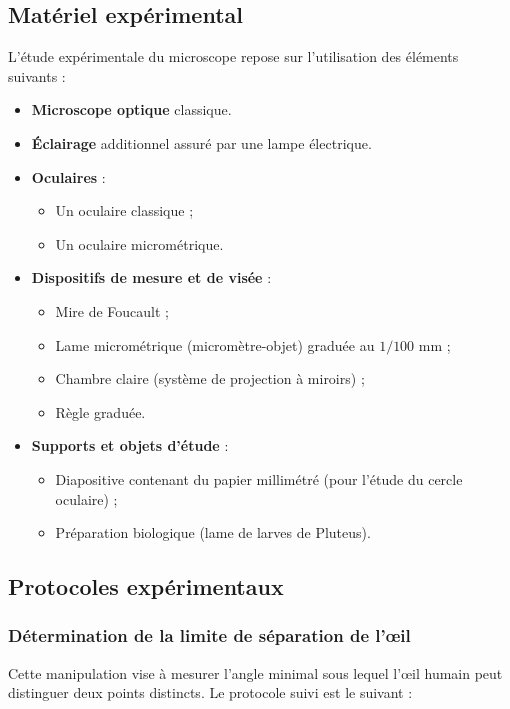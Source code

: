 \subsection{Matériel expérimental}
L'étude expérimentale du microscope repose sur l'utilisation des éléments suivants :

\begin{itemize}
    \item \textbf{Microscope optique} classique. 
    \item \textbf{Éclairage} additionnel assuré par une lampe électrique.
    \item \textbf{Oculaires} :
    \begin{itemize}
        \item Un oculaire classique ;
        \item Un oculaire micrométrique.
    \end{itemize}
    \item \textbf{Dispositifs de mesure et de visée} :
    \begin{itemize}
        \item Mire de Foucault ;
        \item Lame micrométrique (micromètre-objet) graduée au $1/100$ mm ;
        \item Chambre claire (système de projection à miroirs) ;
        \item Règle graduée.
    \end{itemize}
    \item \textbf{Supports et objets d'étude} :
    \begin{itemize}
        \item Diapositive contenant du papier millimétré (pour l'étude du cercle oculaire) ;
        \item Préparation biologique (lame de larves de Pluteus).
    \end{itemize}
\end{itemize} 

\subsection{Protocoles expérimentaux}

\subsubsection{Détermination de la limite de séparation de l'œil}

Cette manipulation vise à mesurer l'angle minimal sous lequel l'œil humain peut distinguer deux points distincts. Le protocole suivi est le suivant :

